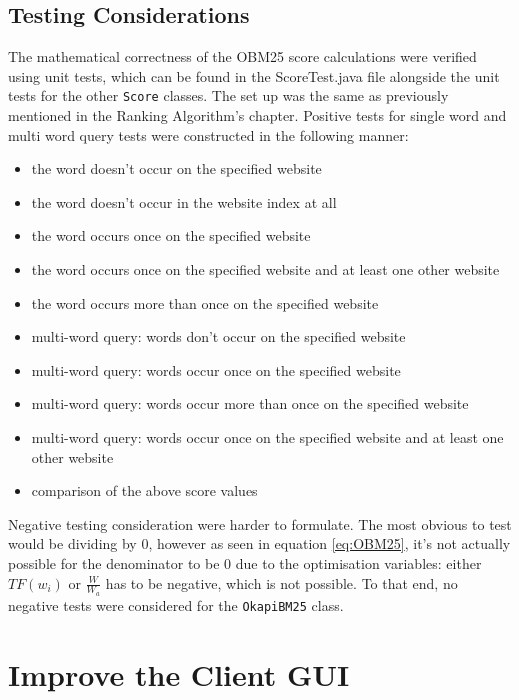 \subsection{Testing Considerations}
The mathematical correctness of the OBM25 score calculations were verified using unit tests, which can be found in the ScoreTest.java file alongside the unit tests for the other {\tt Score} classes.
The set up was the same as previously mentioned in the Ranking Algorithm's chapter.
Positive tests for single word and multi word query tests were constructed in the following manner:
\begin{itemize}
    \item the word doesn't occur on the specified website
    \item the word doesn't occur in the website index at all
    \item the word occurs once on the specified website
    \item the word occurs once on the specified website and at least one other website
    \item the word occurs more than once on the specified website
    \item multi-word query: words don't occur on the specified website
    \item multi-word query: words occur once on the specified website
    \item multi-word query: words occur more than once on the specified website
    \item multi-word query: words occur once on the specified website and at least one other website
    \item comparison of the above score values
\end{itemize}

Negative testing consideration were harder to formulate.
The most obvious to test would be dividing by 0, however as seen in equation \ref{eq:OBM25}, it's not actually possible for the denominator to be 0 due to the optimisation variables: either $TF(w_i)$ or $\frac{W}{W_a}$ has to be negative, which is not possible.
To that end, no negative tests were considered for the {\tt OkapiBM25} class.

\section{Improve the Client GUI} %

